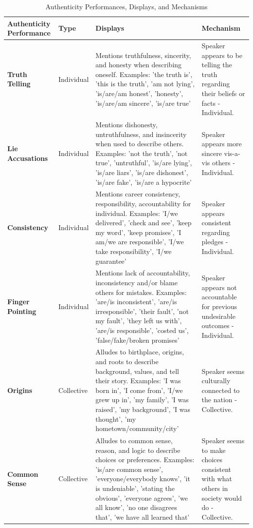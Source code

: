 \documentclass[smallextended]{svjour3}       %
\begin{document}
\begin{landscape}

\begin{table}

\caption{\label{tab:Table 1}Authenticity Performances, Displays, and Mechanisms}
\begin{tabu} to 
\toprule
Authenticity Performance & Type & Displays & Mechanism\\
\midrule
\textbf{Truth Telling} & Individual & Mentions truthfulness, sincerity, and honesty when describing oneself. Examples: 'the truth is', 'this is the truth', 'am not lying', 'is/are/am honest', 'honesty', 'is/are/am sincere', 'is/are true' & Speaker appears to be telling the truth regarding their beliefs or facts - Individual.\\
\textbf{Lie Accusations} & Individual & Mentions dishonesty, untruthfulness, and insincerity when used to describe others. Examples: 'not the truth', 'not true', 'untruthful', 'is/are lying', 'is/are liars', 'is/are dishonest', 'is/are fake', 'is/are a hypocrite' & Speaker appears more sincere vis-a-vis others - Individual.\\
\textbf{Consistency} & Individual & Mentions career consistency, responsibility, accountability for individual. Examples: 'I/we delivered', 'check and see', 'keep my word', 'keep promises', 'I am/we are responsible', 'I/we take responsibility', 'I/we guarantee' & Speaker appears consistent regarding pledges - Individual.\\
\textbf{Finger Pointing} & Individual & Mentions lack of accountability, inconsistency and/or blame others for mistakes. Examples: 'are/is inconsistent', 'are/is irresponsible', 'their fault', 'not my fault', 'they left us with', 'are/is responsible', 'costed us', 'false/fake/broken promises' & Speaker appears not accountable for previous undesirable outcomes - Individual.\\
\textbf{Origins} & Collective & Alludes to birthplace, origins, and roots to describe background, values, and tell their story. Examples: 'I was born in', 'I come from', 'I/we grew up in', 'my family', 'I was raised', 'my background', 'I was thought', 'my hometown/community/city' & Speaker seems culturally connected to the nation - Collective.\\
\addlinespace
\textbf{Common Sense} & Collective & Alludes to common sense, reason, and logic to describe choices or preferences. Examples: 'is/are common sense', 'everyone/everybody knows', 'it is undeniable', 'stating the obvious', 'everyone agrees', 'we all know', 'no one disagrees that', 'we have all learned that' & Speaker seems to make choices consistent with what others in society would do - Collective.\\

\end{tabu}
\end{table}
\end{landscape}
\end{document}
